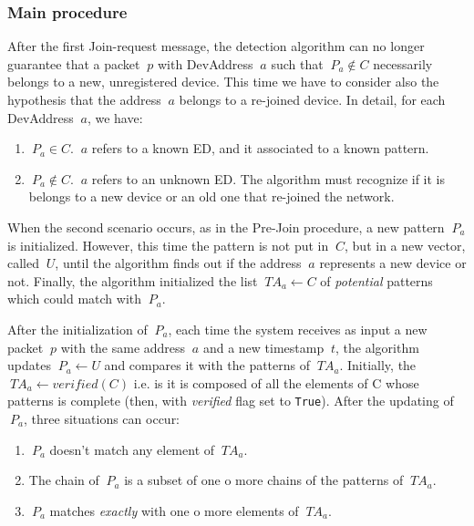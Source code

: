 \subsubsection{Main procedure}
After the first Join-request message, the detection algorithm can no longer guarantee that a packet \(\ p \) with DevAddress \(\ a \) such that \(\ P_{a} \notin C \) necessarily belongs to a new, unregistered device. This time we have to consider also the hypothesis that the address \(\ a \) belongs to a  re-joined device. In detail, for each DevAddress \(\ a \), we have:

\vspace{3mm}
\begin{enumerate}
	\item \(\ P_{a} \in C \). \(\ a \) refers to a known ED, and it associated to a known pattern.
	\item \(\ P_{a} \notin C \). \(\ a \) refers to an unknown ED. The algorithm must recognize if it is belongs to a new device or an old one that re-joined the network.
\end{enumerate}
\vspace{3mm}

When the second scenario occurs, as in the Pre-Join procedure, a new pattern \(\ P_{a} \) is initialized. However, this time the pattern is not put in \(\ C \), but in a new vector, called \(\ U \), until the algorithm finds out if the address \(\ a \) represents a new device or not. Finally, the algorithm initialized the list \(\ TA_{a} \gets C \) of \textit{potential} patterns which could match with \(\ P_{a}\).

\vspace{5mm}

After the initialization of \(\ P_{a} \), each time the system receives as input a new packet \(\ p \) with the same address \(\ a \) and a new timestamp \(\ t \), the algorithm updates \(\ P_{a} \gets U \) and compares it with the patterns of \(\ TA_{a} \). Initially, the \(\ TA_{a} \gets verified(C) \) i.e. is it is composed of all the elements of C whose patterns is complete (then, with \textit{verified} flag set to \texttt{True}). After the updating of \(\ P_{a} \), three situations can occur:

\vspace{3mm}
\begin{enumerate}
	\item \(\ P_{a} \) doesn't match any element of \(\ TA_{a} \).
	\item The chain of \(\ P_{a} \) is a subset of one o more chains of the patterns of \(\ TA_{a} \).
	\item \(\ P_{a} \) matches \textit{exactly} with one o more elements of \(\ TA_{a} \).
\end{enumerate}
\vspace{3mm}

